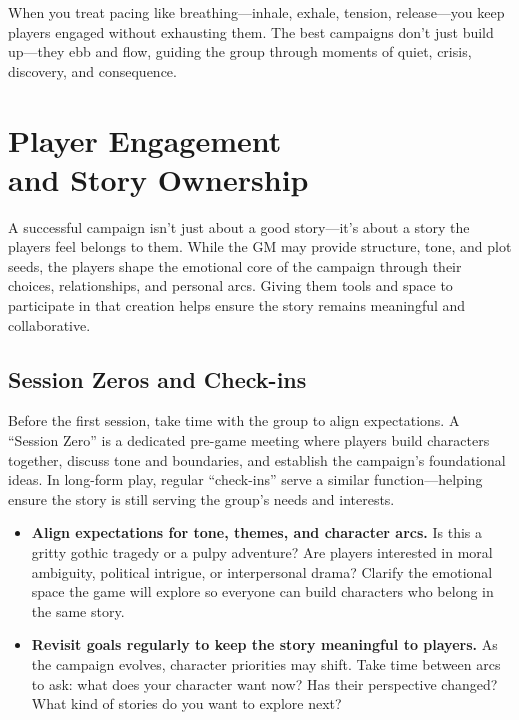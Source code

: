 When you treat pacing like breathing—inhale, exhale, tension, release—you keep players engaged without exhausting them. The best campaigns don’t just build up—they ebb and flow, guiding the group through moments of quiet, crisis, discovery, and consequence.



\section[Player Engagement and Story Ownership]{Player Engagement\\ and Story Ownership}

A successful campaign isn’t just about a good story—it’s about a story the players feel belongs to them. While the GM may provide structure, tone, and plot seeds, the players shape the emotional core of the campaign through their choices, relationships, and personal arcs. Giving them tools and space to participate in that creation helps ensure the story remains meaningful and collaborative.

\subsection*{Session Zeros and Check-ins}

Before the first session, take time with the group to align expectations. A “Session Zero” is a dedicated pre-game meeting where players build characters together, discuss tone and boundaries, and establish the campaign’s foundational ideas. In long-form play, regular “check-ins” serve a similar function—helping ensure the story is still serving the group’s needs and interests.

\begin{itemize}\raggedright
    \item \textbf{Align expectations for tone, themes, and character arcs.}  
    Is this a gritty gothic tragedy or a pulpy adventure? Are players interested in moral ambiguity, political intrigue, or interpersonal drama? Clarify the emotional space the game will explore so everyone can build characters who belong in the same story.

    \item \textbf{Revisit goals regularly to keep the story meaningful to players.}  
    As the campaign evolves, character priorities may shift. Take time between arcs to ask: what does your character want now? Has their perspective changed? What kind of stories do you want to explore next?
\end{itemize}

